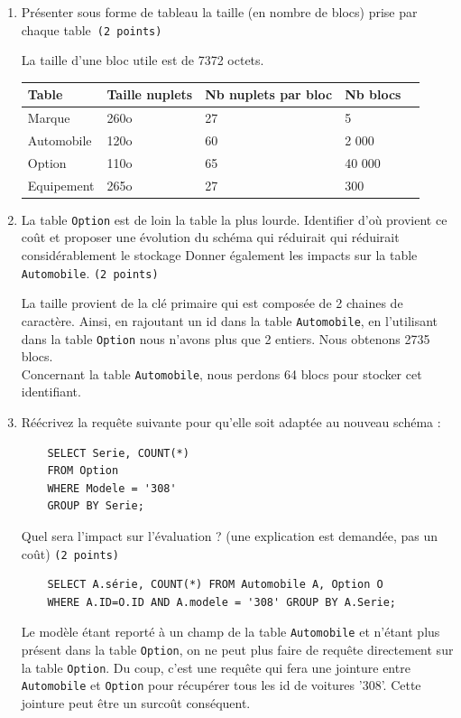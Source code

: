 \begin{enumerate}
    \item Présenter sous forme de tableau la taille (en nombre de blocs) prise par chaque table~{\tt (2~points)}
\begin{solution}
    La taille d'une bloc utile est de 7372 octets.\\
    \begin{tabular}{|l|l|l|l|l|}
    \hline
    \textbf{Table} & {\bf Taille nuplets}    & {\bf Nb nuplets par bloc} & {\bf Nb blocs}\\
    \hline
    \hline
    Marque      & 260o  & 27    & 5\\
    Automobile  & 120o  & 60    & 2 000\\
    Option      & 110o  & 65    & 40 000\\
    Equipement  & 265o  & 27    & 300\\
    \hline
    \end{tabular}
\end{solution}
    \item La table {\tt Option} est de loin la table la plus lourde. Identifier d'où provient ce coût et proposer 
       une évolution du schéma  qui réduirait qui réduirait considérablement le stockage 
  Donner également les impacts sur la table {\tt Automobile}. {\tt (2~points)}
\begin{solution}
    La taille provient de la clé primaire qui est composée de 2 chaines de caractère. Ainsi, 
	 en rajoutant un id dans la table {\tt Automobile}, en l'utilisant dans 
	  la table {\tt Option} nous n'avons plus que 2 entiers. Nous obtenons 2735 blocs.\\
    Concernant la table {\tt Automobile}, nous perdons 64 blocs pour stocker cet identifiant.
\end{solution}

    \item Réécrivez la requête suivante pour qu'elle soit adaptée au nouveau schéma :

\begin{verbatim}
    SELECT Serie, COUNT(*) 
    FROM Option 
    WHERE Modele = '308' 
    GROUP BY Serie;
\end{verbatim}
    Quel sera l'impact sur l'évaluation ? (une explication est demandée, pas un coût) {\tt (2~points)}
\begin{solution}
    \begin{verbatim}
    SELECT A.série, COUNT(*) FROM Automobile A, Option O
    WHERE A.ID=O.ID AND A.modele = '308' GROUP BY A.Serie;
    \end{verbatim}
    Le modèle étant reporté à un champ de la table {\tt Automobile} 
	 et n'étant plus présent dans la table {\tt Option}, 
    on ne peut plus faire de requête directement sur la table {\tt Option}. Du coup, 
    c'est une requête qui fera une jointure entre {\tt Automobile} et {\tt Option} 
    pour récupérer tous les id de voitures '308'. Cette jointure peut être un surcoût conséquent.
\end{solution}


\end{enumerate}
